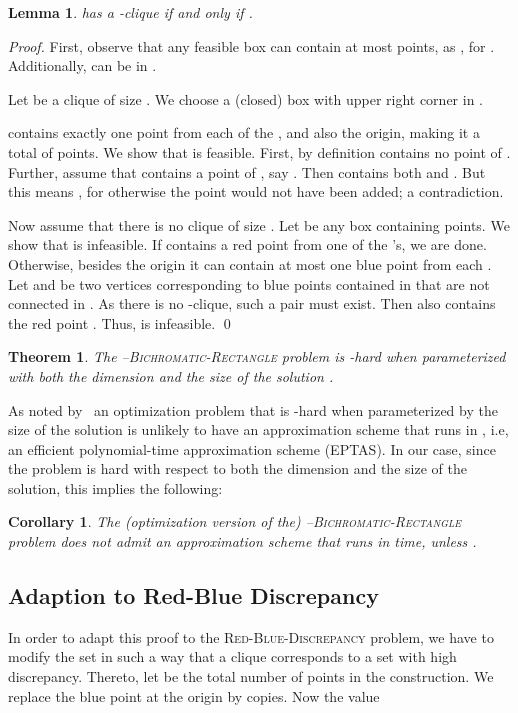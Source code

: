 \documentclass[12pt]{article}
\newtheorem{theorem}{Theorem}
\newtheorem{lemma}{Lemma}
\newtheorem{corollary}{Corollary}
\begin{document}
\begin{lemma}\label{Lemma:RedBlueMain}  has a -clique if and only if .
\end{lemma}
\begin{proof} First, observe that any feasible box  can contain at most  points, as , for . Additionally,  can be in . 

Let  be a clique of size . We choose a (closed) box  with upper right corner  in . 

 contains exactly one point from each of the , and also the origin, making it a total of  points. We show that  is feasible. First, by definition  contains no point of . Further, assume that  contains a point of , say . Then  contains both  and . But this means , for otherwise the point  would not have been added; a contradiction.

Now assume that there is no clique of size . Let  be any
box containing  points. We show that  is infeasible. If
 contains a red point from one of the 's, we are
done. Otherwise, besides the origin it can contain at most one blue point from each
. Let  and  be two vertices corresponding to blue
points contained in  that are not connected in . As there is no
-clique, such a pair must exist. Then  also contains the red point . Thus,
 is infeasible. \qed
\end{proof}
\begin{theorem} The --\textsc{Bichromatic-Rectangle} problem is -hard when parameterized with both the dimension  and the size of the solution .
\end{theorem}

As noted by~\cite{DBLP:journals/ipl/CesatiT97} an optimization problem that is -hard when parameterized by the size of the solution is unlikely to have 
an approximation scheme that runs in , i.e, an efficient polynomial-time approximation scheme (EPTAS). In our case, since the problem is
hard with respect to both the dimension and the size of the solution, this implies the following:

\begin{corollary}
  The (optimization version of the)
  --\textsc{Bichromatic-Rectangle} problem does not admit an
  approximation scheme that runs in  time, unless .
\end{corollary}

\subsection{Adaption to Red-Blue Discrepancy}
In order to adapt this proof to the \textsc{Red-Blue-Discrepancy} problem, we have to modify the set in such a way that a clique corresponds to a set with high discrepancy. Thereto, let  be the total number of points in the construction. We replace the blue point at the origin by  copies. Now the value
\end{document}
